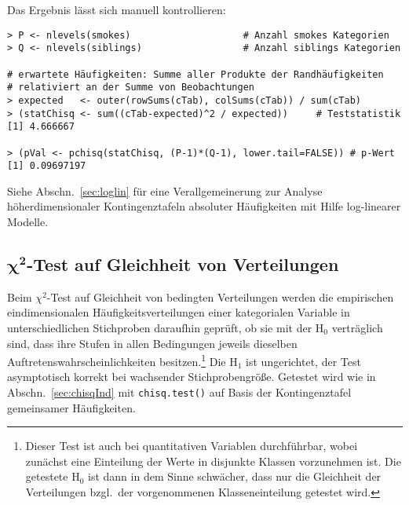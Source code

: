 Das Ergebnis lässt sich manuell kontrollieren:
\begin{lstlisting}
> P <- nlevels(smokes)                    # Anzahl smokes Kategorien
> Q <- nlevels(siblings)                  # Anzahl siblings Kategorien

# erwartete Häufigkeiten: Summe aller Produkte der Randhäufigkeiten
# relativiert an der Summe von Beobachtungen
> expected   <- outer(rowSums(cTab), colSums(cTab)) / sum(cTab)
> (statChisq <- sum((cTab-expected)^2 / expected))     # Teststatistik
[1] 4.666667

> (pVal <- pchisq(statChisq, (P-1)*(Q-1), lower.tail=FALSE)) # p-Wert
[1] 0.09697197
\end{lstlisting}

Siehe Abschn.\ \ref{sec:loglin} für eine Verallgemeinerung zur Analyse höherdimensionaler Kontingenztafeln absoluter Häufigkeiten mit Hilfe log-linearer Modelle.

\subsection[\texorpdfstring{$\chi^{2}$}{chi2}-Test auf Gleichheit von Verteilungen]{$\bm{\chi^{2}}$-Test auf Gleichheit von Verteilungen}
\label{sec:chisqEq}

Beim $\chi^{2}$-Test auf Gleichheit von bedingten Verteilungen werden die empirischen eindimensionalen Häufigkeitsverteilungen einer kategorialen Variable in unterschiedlichen Stichproben daraufhin geprüft, ob sie mit der $\text{H}_{0}$ verträglich sind, dass ihre Stufen in allen Bedingungen jeweils dieselben Auftretenswahrscheinlichkeiten besitzen.\footnote{Dieser Test ist auch bei quantitativen Variablen durchführbar, wobei zunächst eine Einteilung der Werte in disjunkte Klassen vorzunehmen ist. Die getestete $\text{H}_{0}$ ist dann in dem Sinne schwächer, dass nur die Gleichheit der Verteilungen bzgl.\ der vorgenommenen Klasseneinteilung getestet wird.} Die $\text{H}_{1}$ ist ungerichtet, der Test asymptotisch korrekt bei wachsender Stichprobengröße. Getestet wird wie in Abschn.\ \ref{sec:chisqInd} mit \lstinline!chisq.test()! auf Basis der Kontingenztafel gemeinsamer Häufigkeiten.

